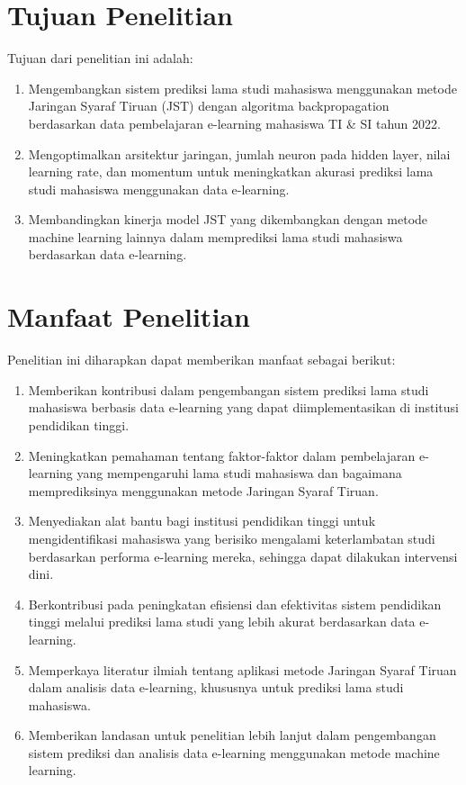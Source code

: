 \section{Tujuan Penelitian}
Tujuan dari penelitian ini adalah:
    \begin{enumerate}
        \item Mengembangkan sistem prediksi lama studi mahasiswa menggunakan metode Jaringan Syaraf Tiruan (JST) dengan algoritma backpropagation berdasarkan data pembelajaran e-learning mahasiswa TI \& SI tahun 2022.
        \item Mengoptimalkan arsitektur jaringan, jumlah neuron pada hidden layer, nilai learning rate, dan momentum untuk meningkatkan akurasi prediksi lama studi mahasiswa menggunakan data e-learning.
        \item Membandingkan kinerja model JST yang dikembangkan dengan metode machine learning lainnya dalam memprediksi lama studi mahasiswa berdasarkan data e-learning.
    \end{enumerate}

\section{Manfaat Penelitian}
Penelitian ini diharapkan dapat memberikan manfaat sebagai berikut:

    \begin{enumerate}
        \item Memberikan kontribusi dalam pengembangan sistem prediksi lama studi mahasiswa berbasis data e-learning yang dapat diimplementasikan di institusi pendidikan tinggi.
        \item Meningkatkan pemahaman tentang faktor-faktor dalam pembelajaran e-learning yang mempengaruhi lama studi mahasiswa dan bagaimana memprediksinya menggunakan metode Jaringan Syaraf Tiruan.
        \item Menyediakan alat bantu bagi institusi pendidikan tinggi untuk mengidentifikasi mahasiswa yang berisiko mengalami keterlambatan studi berdasarkan performa e-learning mereka, sehingga dapat dilakukan intervensi dini.
        \item Berkontribusi pada peningkatan efisiensi dan efektivitas sistem pendidikan tinggi melalui prediksi lama studi yang lebih akurat berdasarkan data e-learning.
        \item Memperkaya literatur ilmiah tentang aplikasi metode Jaringan Syaraf Tiruan dalam analisis data e-learning, khususnya untuk prediksi lama studi mahasiswa.
        \item Memberikan landasan untuk penelitian lebih lanjut dalam pengembangan sistem prediksi dan analisis data e-learning menggunakan metode machine learning.
    \end{enumerate}

